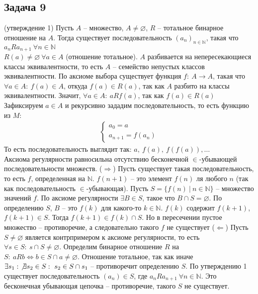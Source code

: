 \subsection*{Задача 9}
	(утверждение 1) Пусть $A$ -- множество, $A \ne \varnothing$, $R$ -- тотальное бинарное отношение на $A$. Тогда существует последовательность $(a_n)_{n \in \mathbb{N}}$, такая что $a_n R a_{n+1}\ \forall n \in \mathbb{N}$\\
	$R(a) \ne \varnothing\ \forall a \in A$ (отношение тотальное). $A$ разбивается на непересекающиеся классы эквивалентности, то есть $A$ -- семейство непустых классов эквивалентности. По аксиоме выбора существует функция $f:\ A \to A$, такая что $\forall a \in A:\ f(a) \in A$, откуда $f(a) \in R(a)$, так как $A$ разбито на классы эквивалентности. Значит, $\forall a \in A:\ a R f(a)$, так как $f(a) \in R(a)$
	\vskip 0.1in
	Зафиксируем $a \in A$ и рекурсивно зададим последовательность, то есть функцию из $M$:
	\begin{gather*}
	\begin{cases}
		a_0 = a\\
		a_{n+1} = f(a_n)
	\end{cases}
	\end{gather*}
	То есть последовательность выглядит так: $a,\ f(a),\ f(f(a)), \ldots$\\
	Аксиома регулярности равносильна отсутствию бесконечной $\in$-убывающей последовательности множеств.
	\vskip 0.1in
	($\Rightarrow$) Пусть существует такая последовательность, то есть $f$, определенная на $\mathbb{N}$. $f(n+1)$ -- это элемент $f(n)$ ля любого $n$ (так как последовательность $\in$-убывающая). Пусть $S = \{f(n)\ |\ n \in \mathbb{N}\}$ -- множество значений $f$. По аксиоме регулярности $\exists B \in S$, такое что $B \cap S = \varnothing$. По определению $S$, $B$ -- это $f(k)$ для какого-то $k \in \mathbb{N}$. $f(k)$ содержит $f(k+1)$, $f(k+1) \in S$. Тогда $f(k+1) \in f(k) \cap S$. Но в пересечении пустое множество -- противоречие, а следовательно такого $f$ не существует
	\vskip 0.1in
	($\Leftarrow$) Пусть $S \ne \varnothing$ является контрпримером к аксиоме регулярности, то есть $\forall s \in S:\ s \cap S \ne \varnothing$. Определим бинарное отношение $R$ на $S:\ aRb \Leftrightarrow b \in S \cap a \ne \varnothing$. Отношение тотальное, так как иначе $\exists s_1:\ \not\exists s_2 \in S:\ s_2 \in S \cap s_1$ -- противоречит определению $S$. По утверждению 1 существует последовательность $(a_n) \in S$, где $a_n R a_{n+1}\ \forall n \in \mathbb{N}$. Это бесконечная убывающая цепочка -- противоречие, такого $S$ не существует.
\vskip 0.4in

